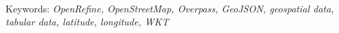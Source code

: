 \lipsum[1-3]\\[2\baselineskip]

Keywords: \textit{OpenRefine, OpenStreetMap, Overpass, GeoJSON, geospatial data, tabular data, latitude, longitude, WKT}